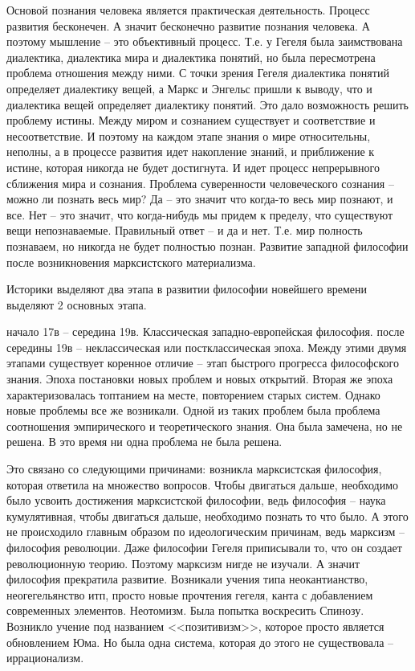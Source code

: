 Основой познания человека является практическая деятельность. Процесс развития бесконечен. А значит бесконечно развитие познания человека. А поэтому мышление – это объективный процесс. Т.е. у Гегеля была заимствована диалектика, диалектика мира и диалектика понятий, но была пересмотрена проблема отношения между ними. С точки зрения Гегеля диалектика понятий определяет диалектику вещей, а Маркс и Энгельс пришли к выводу, что и диалектика вещей определяет диалектику понятий. Это дало возможность решить проблему истины. Между миром и сознанием существует и соответствие и несоответствие. И поэтому на каждом этапе знания о мире относительны, неполны, а в процессе развития идет накопление знаний, и приближение к истине, которая никогда не будет достигнута. И идет процесс непрерывного сближения мира и сознания. Проблема суверенности человеческого сознания – можно ли познать весь мир? Да – это значит что когда-то весь мир познают, и все. Нет – это значит, что когда-нибудь мы придем к пределу, что существуют вещи непознаваемые. Правильный ответ – и да и нет. Т.е. мир полность познаваем, но никогда не будет полностью познан.
Развитие западной философии после возникновения марксистского материализма.

Историки выделяют два этапа в развитии философии новейшего времени выделяют 2 основных этапа.

    начало 17в – середина 19в. Классическая западно-европейская философия.
    после середины 19в – неклассическая или постклассическая эпоха. Между этими двумя этапами существует коренное отличие – этап быстрого прогресса философского знания. Эпоха постановки новых проблем и новых открытий. Вторая же эпоха характеризовалась топтанием на месте, повторением старых систем. Однако новые проблемы все же возникали. Одной из таких проблем была проблема соотношения эмпирического и теоретического знания. Она была замечена, но не решена. В это время ни одна проблема не была решена.

Это связано со следующими причинами: возникла марксистская философия, которая ответила на множество вопросов. Чтобы двигаться дальше, необходимо было усвоить достижения марксистской философии, ведь философия – наука кумулятивная, чтобы двигаться дальше, необходимо познать то что было. А этого не происходило главным образом по идеологическим причинам, ведь марксизм – философия революции. Даже философии Гегеля приписывали то, что он создает революционную теорию. Поэтому марксизм нигде не изучали. А значит философия прекратила развитие. Возникали учения типа неокантианство, неогегельянство итп, просто новые прочтения гегеля, канта с добавлением современных элементов. Неотомизм. Была попытка воскресить Спинозу. Возникло учение под названием <<позитивизм>>, которое просто является обновлением Юма. Но была одна система, которая до этого не существовала – иррационализм.

